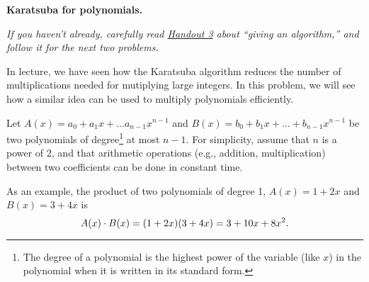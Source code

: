 \documentclass[11pt,addpoints,answers]{exam}
\begin{document}
\begin{questions}

  \question \textbf{Karatsuba for polynomials.} 

  \emph{If you haven't already, carefully read \href{https://drive.google.com/file/d/1QidTYWPi4SeJLjT5I1MkhsQJvAnk6noY/view?usp=drive_link}{Handout 3} about ``giving an algorithm,'' and follow it for the next two problems.}

  In lecture, we have seen how the Karatsuba algorithm reduces the number of multiplications needed for mutiplying large integers. In this problem, we will see how a similar idea can be used to multiply polynomials efficiently. 

  Let $A(x) = a_0 + a_1 x + \ldots a_{n-1} x^{n-1}$ and $B(x) = b_0 + b_1 x + \ldots + b_{n-1} x^{n-1}$ be two polynomials of degree\footnote{The degree of a polynomial is the highest power of the variable (like $x$) in the polynomial when it is written in its standard form.} at most $n-1$. For simplicity, assume that $n$ is a power of 2, and that arithmetic operations (e.g., addition, multiplication) between two coefficients can be done in constant time. 

  As an example, the product of two polynomials of degree 1, $A(x) = 1 + 2x$ and $B(x) = 3 + 4x$ is 
  \[
    A(x) \cdot B(x) = (1 + 2x)(3 + 4x) = 3 + 10x + 8x^2 \text .
  \]


\end{questions}
\end{document}
